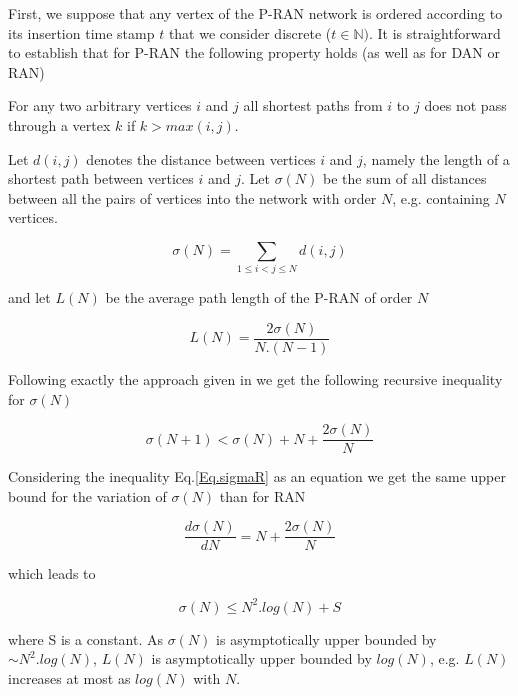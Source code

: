 \documentclass[11pt]{iopart}
\begin{document}
First, we suppose that any vertex of the P-RAN network is ordered according to its insertion time stamp $t$ that we consider discrete ($t\in \mathbb{N})$. It is straightforward to establish that for P-RAN the following property holds (as well as for DAN or RAN)

For any two arbitrary vertices $i$ and $j$ all shortest paths from $i$ to $j$ does not pass through a vertex $k$ if $k>max(i,j)$. 

Let $d(i,j)$ denotes the distance between vertices $i$ and $j$, namely the length of a shortest path between vertices $i$ and $j$. Let $\sigma(N)$ be the sum of all distances between all the pairs of vertices into the network with order $N$, e.g. containing $N$ vertices.

\begin{equation}
\label{Eq.sigma}
   \sigma(N)=\sum_{1 \leq i < j \leq N} d(i,j)
\end{equation}

and let $L(N)$ be the average path length of the P-RAN of order $N$ 

\begin{equation}
\label{Eq.APL}
   L(N)= \frac{2\sigma(N)}{N.(N-1)}
\end{equation}

Following exactly the approach given in \cite{zhang-2006a} we get the following recursive inequality for $\sigma(N)$

\begin{equation}
\label{Eq.sigmaR}
   \sigma(N+1) < \sigma(N) + N + \frac{2\sigma(N)}{N}
\end{equation}

Considering the inequality Eq.\ref{Eq.sigmaR} as an equation we get the same upper bound for the variation of $\sigma(N)$ than for RAN

\begin{equation}
\label{Eq.sigmaV}
   \frac{d\sigma(N)}{dN} = N + \frac{2\sigma(N)}{N} 
\end{equation}

which leads to

\begin{equation}
\label{Eq.sigmaV2}
   \sigma(N) \leq N^2.log(N) + S 
\end{equation}

where S is a constant. As $\sigma(N)$ is asymptotically upper bounded by  $\sim N^2.log(N)$, $L(N)$ is asymptotically upper bounded by $log(N)$, e.g. $L(N)$ increases at most as $log(N)$ with $N$.
\end{document}
